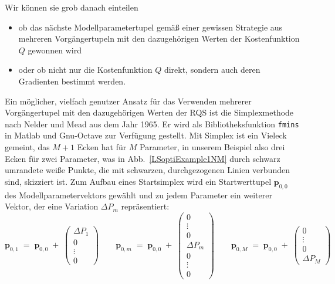 Wir können sie grob danach einteilen
\begin{itemize}
\item ob das nächste Modellparametertupel gemäß einer gewissen Strategie aus
mehreren Vor\-gänger\-tupeln mit den dazugehörigen Werten der Kostenfunktion $Q$ gewonnen wird
\item oder ob nicht nur die Kostenfunktion $Q$ direkt, sondern auch deren Gradienten bestimmt
werden.
\end{itemize}
Ein möglicher, vielfach genutzer Ansatz für das Verwenden mehrerer Vorgängertupel mit den dazugehörigen Werten der RQS
ist die Simplexmethode nach Nelder und Mead aus dem Jahr 1965. Er wird als Bibliotheksfunktion \texttt{fmins}
in Matlab und Gnu-Octave zur Verfügung gestellt. Mit Simplex ist ein Vieleck gemeint, das $M+1$ Ecken hat für $M$
Parameter, in unserem Beispiel also drei Ecken für zwei Parameter, was in Abb.~\ref{LSoptiExample1NM} durch
schwarz umrandete weiße Punkte, die mit schwarzen, durchgezogenen Linien verbunden sind, skizziert ist. Zum Aufbau eines
Startsimplex wird ein Startwerttupel $\mathbf{p}_{0,0}$ des Modellparametervektors gewählt und zu jedem Parameter ein
weiterer Vektor, der eine Variation $\Delta P_m$ repräsentiert:
\begin{equation}
\mathbf{p}_{0,1} \; = \; \mathbf{p}_{0,0} \; + \; \left(\begin{array}{c}
\Delta P_1 \\
0 \\
\vdots \\
0
\end{array}\right) \qquad
\mathbf{p}_{0,m} \; = \; \mathbf{p}_{0,0} \; + \; \left(\begin{array}{c}
0 \\
\vdots \\
0 \\
\Delta P_m \\
0 \\
\vdots \\
0
\end{array}\right) \qquad
\mathbf{p}_{0,M} \; = \; \mathbf{p}_{0,0} \; + \; \left(\begin{array}{c}
0 \\
\vdots \\
0 \\
\Delta P_M
\end{array}\right)
\end{equation}
